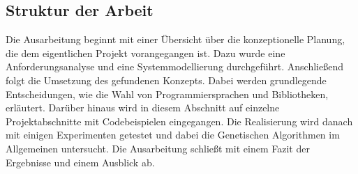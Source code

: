 \subsection{Struktur der Arbeit}
Die Ausarbeitung beginnt mit einer Übersicht über die konzeptionelle Planung, die dem eigentlichen Projekt vorangegangen ist. Dazu wurde eine Anforderungsanalyse und eine Systemmodellierung durchgeführt. Anschließend folgt die Umsetzung des gefundenen Konzepts. Dabei werden grundlegende Entscheidungen, wie die Wahl von Programmiersprachen und Bibliotheken, erläutert. Darüber hinaus wird in diesem Abschnitt auf einzelne Projektabschnitte mit Codebeispielen eingegangen. Die Realisierung wird danach mit einigen Experimenten getestet und dabei die Genetischen Algorithmen im Allgemeinen untersucht. Die Ausarbeitung schließt mit einem Fazit der Ergebnisse und einem Ausblick ab.


